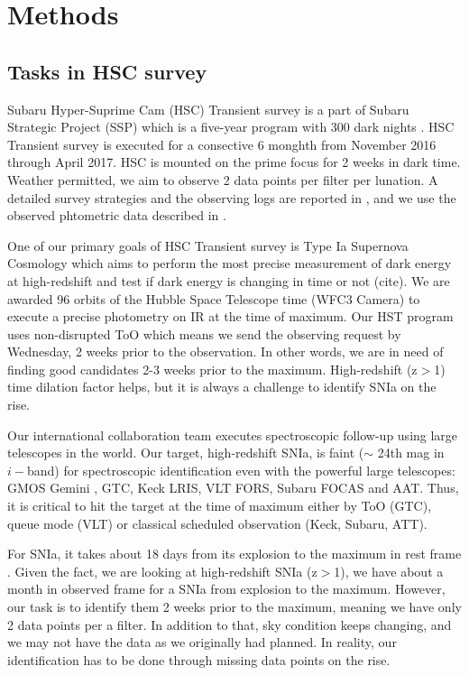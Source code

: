 \documentclass[useamsfonts]{pasj01}
\begin{document}
\section{Methods}
\subsection{Tasks in HSC survey}
\label{sec:tasks}
Subaru Hyper-Suprime Cam (HSC) Transient survey is a part of Subaru Strategic Project (SSP) which is a five-year program with 300 dark nights \citep{aihara18a,miyazaki18a}.
HSC Transient survey is executed for a consective 6 monghth from November 2016 through April 2017.
HSC is mounted on the prime focus for 2 weeks in dark time.   
Weather permitted, we aim to observe 2 data points per filter per lunation.
A detailed survey strategies and the observing logs are reported in \citet{yasuda19a}, and we use the observed phtometric data described in \citet{yasuda19a}.

One of our primary goals of HSC Transient survey is Type Ia Supernova Cosmology which aims to perform the most precise measurement of dark energy at high-redshift and test if dark energy is changing in time or not (cite).
We are awarded 96 orbits of the Hubble Space Telescope time (WFC3 Camera) to execute a precise photometry on IR at the time of maximum.
Our HST program uses non-disrupted ToO which means we send the observing request by Wednesday, 2 weeks prior to the observation.
In other words, we are in need of finding good candidates 2-3 weeks prior to the maximum.  High-redshift (z$>$1) time dilation factor helps, but it is always a challenge to identify SNIa on the rise.

Our international collaboration team executes spectroscopic follow-up using large telescopes in the world.  
Our target, high-redshift SNIa, is faint ($\sim$ 24th mag in $i-$band) for spectroscopic identification even with the powerful large telescopes: GMOS Gemini \citep{hook04a}, GTC, Keck LRIS, VLT FORS, Subaru FOCAS \citep{kashikawa02a} and AAT.  
Thus, it is critical to hit the target at the time of maximum either by ToO (GTC), queue mode (VLT) or classical scheduled observation (Keck, Subaru, ATT).

For SNIa, it takes about 18 days from its explosion to the maximum in rest frame \citep{conley06a,papadogiannakis19a}.   Given the fact, we are looking at high-redshift SNIa (z$>$1), we have about a month in observed frame for a SNIa from explosion to the maximum.   However, our task is to identify them 2 weeks prior to the maximum, meaning we have only 2 data points per a filter.   In addition to that, sky condition keeps changing, and we may not have the data as we originally had planned.   In reality, our identification has to be done through missing data points on the rise.
\end{document}
